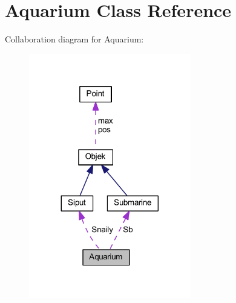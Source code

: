 \hypertarget{class_aquarium}{}\section{Aquarium Class Reference}
\label{class_aquarium}


Collaboration diagram for Aquarium\+:\nopagebreak
\begin{figure}[H]
\begin{center}
\leavevmode
\includegraphics[width=200pt]{class_aquarium__coll__graph}
\end{center}
\end{figure}
